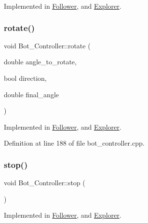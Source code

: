 Implemented in \hyperlink{class_follower_ae9e1df72904d2171d99f7bd18ccd89ab}{Follower}, and \hyperlink{class_explorer_a71d49e07fda9132640ef7ca560492065}{Explorer}.

\mbox{\label{class_bot___controller_a19ba7ced629e4ee9a0743efdef4a5cc7}} 
\subsubsection{\texorpdfstring{rotate()}{rotate()}}
{\footnotesize\ttfamily void Bot\+\_\+\+Controller\+::rotate (\begin{DoxyParamCaption}\item[{double}]{angle\+\_\+to\+\_\+rotate,  }\item[{bool}]{direction,  }\item[{double}]{final\+\_\+angle }\end{DoxyParamCaption})\hspace{0.3cm}{\ttfamily [pure virtual]}}



Implemented in \hyperlink{class_follower_ae241d3dc81b6ddebdfbede88e2cebb98}{Follower}, and \hyperlink{class_explorer_a2616a65bd251592f1b9f151546d429d8}{Explorer}.



Definition at line 188 of file bot\+\_\+controller.\+cpp.

\mbox{\label{class_bot___controller_a28d1caa8c0ed9d8fb313caacecc5e71b}} 
\subsubsection{\texorpdfstring{stop()}{stop()}}
{\footnotesize\ttfamily void Bot\+\_\+\+Controller\+::stop (\begin{DoxyParamCaption}{ }\end{DoxyParamCaption})\hspace{0.3cm}{\ttfamily [pure virtual]}}



Implemented in \hyperlink{class_follower_a098544bd512f5d5b054e15d173cec066}{Follower}, and \hyperlink{class_explorer_a44a5755de0e7a3934265a8f9ab4c9b2e}{Explorer}.



